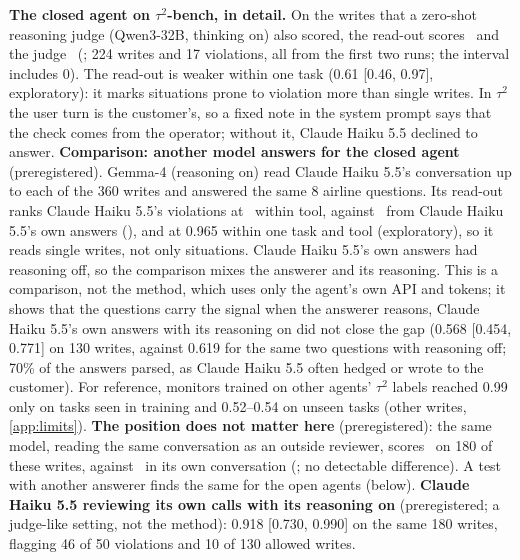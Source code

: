 \textbf{The closed agent on $\tau^2$-bench, in detail.} On the writes that a zero-shot reasoning judge (Qwen3-32B, thinking on) also scored, the read-out scores \GEeJudgeOurs\ and the judge \GEeJudge\ (\GEeRthree; 224 writes and 17 violations, all from the first two runs; the interval includes 0). The read-out is weaker within one task (0.61 [0.46, 0.97], exploratory): it marks situations prone to violation more than single writes. In $\tau^2$ the user turn is the customer's, so a fixed note in the system prompt says that the check comes from the operator; without it, Claude Haiku 5.5 declined to answer. \textbf{Comparison: another model answers for the closed agent} (preregistered). Gemma-4 (reasoning on) read Claude Haiku 5.5's conversation up to each of the 360 writes and answered the same 8 airline questions. Its read-out ranks Claude Haiku 5.5's violations at \GTwoneGemma\ within tool, against \GTwoneOwn\ from Claude Haiku 5.5's own answers (\GTwoneDiff), and at 0.965 within one task and tool (exploratory), so it reads single writes, not only situations. Claude Haiku 5.5's own answers had reasoning off, so the comparison mixes the answerer and its reasoning. This is a comparison, not the method, which uses only the agent's own API and tokens; it shows that the questions carry the signal when the answerer reasons, Claude Haiku 5.5's own answers with its reasoning on did not close the gap (0.568 [0.454, 0.771] on 130 writes, against 0.619 for the same two questions with reasoning off; 70\% of the answers parsed, as Claude Haiku 5.5 often hedged or wrote to the customer). For reference, monitors trained on other agents' $\tau^2$ labels reached 0.99 only on tasks seen in training and 0.52--0.54 on unseen tasks (other writes, \cref{app:limits}). \textbf{The position does not matter here} (preregistered): the same model, reading the same conversation as an outside reviewer, scores \GNnOut\ on 180 of these writes, against \GNnOwn\ in its own conversation (\GNnDiff; no detectable difference). A test with another answerer finds the same for the open agents (below). \textbf{Claude Haiku 5.5 reviewing its own calls with its reasoning on} (preregistered; a judge-like setting, not the method): 0.918 [0.730, 0.990] on the same 180 writes, flagging 46 of 50 violations and 10 of 130 allowed writes.

